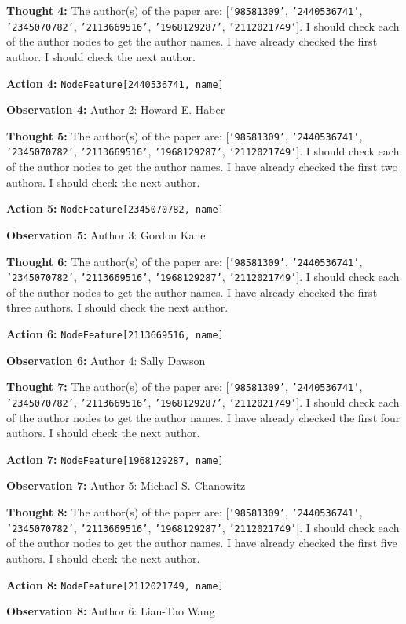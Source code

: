 \textbf{Thought 4:} The author(s) of the paper are: [\texttt{'98581309'}, \texttt{'2440536741'}, \texttt{'2345070782'}, \texttt{'2113669516'}, \texttt{'1968129287'}, \texttt{'2112021749'}]. I should check each of the author nodes to get the author names. I have already checked the first author. I should check the next author. \par
\textbf{Action 4:} \texttt{NodeFeature[2440536741, name]} \par
\textbf{Observation 4:} Author 2: Howard E. Haber \par

\textbf{Thought 5:} The author(s) of the paper are: [\texttt{'98581309'}, \texttt{'2440536741'}, \texttt{'2345070782'}, \texttt{'2113669516'}, \texttt{'1968129287'}, \texttt{'2112021749'}]. I should check each of the author nodes to get the author names. I have already checked the first two authors. I should check the next author. \par
\textbf{Action 5:} \texttt{NodeFeature[2345070782, name]} \par
\textbf{Observation 5:} Author 3: Gordon Kane \par

\textbf{Thought 6:} The author(s) of the paper are: [\texttt{'98581309'}, \texttt{'2440536741'}, \texttt{'2345070782'}, \texttt{'2113669516'}, \texttt{'1968129287'}, \texttt{'2112021749'}]. I should check each of the author nodes to get the author names. I have already checked the first three authors. I should check the next author. \par
\textbf{Action 6:} \texttt{NodeFeature[2113669516, name]} \par
\textbf{Observation 6:} Author 4: Sally Dawson \par

\textbf{Thought 7:} The author(s) of the paper are: [\texttt{'98581309'}, \texttt{'2440536741'}, \texttt{'2345070782'}, \texttt{'2113669516'}, \texttt{'1968129287'}, \texttt{'2112021749'}]. I should check each of the author nodes to get the author names. I have already checked the first four authors. I should check the next author. \par
\textbf{Action 7:} \texttt{NodeFeature[1968129287, name]} \par
\textbf{Observation 7:} Author 5: Michael S. Chanowitz \par

\textbf{Thought 8:} The author(s) of the paper are: [\texttt{'98581309'}, \texttt{'2440536741'}, \texttt{'2345070782'}, \texttt{'2113669516'}, \texttt{'1968129287'}, \texttt{'2112021749'}]. I should check each of the author nodes to get the author names. I have already checked the first five authors. I should check the next author. \par
\textbf{Action 8:} \texttt{NodeFeature[2112021749, name]} \par
\textbf{Observation 8:} Author 6: Lian-Tao Wang \par


